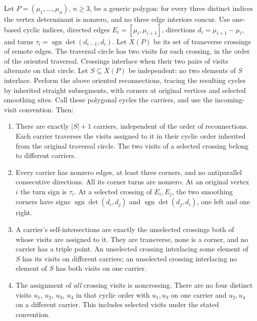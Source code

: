 \begin{lemma}\label{lem:carriers}\leanok
Let $P=(\mu_1,\ldots,\mu_n)$, $n\geq3$, be a generic polygon: for every
three distinct indices the vertex determinant is nonzero, and no three
edge interiors concur.
Use one-based cyclic indices, directed edges
$E_i=[\mu_i,\mu_{i+1}]$, directions $d_i=\mu_{i+1}-\mu_i$, and turns
$\tau_i=\operatorname{sgn}\det(d_{i-1},d_i)$.
Let $X(P)$ be its set of transverse crossings of remote edges. The
traversal circle has two visits for each crossing, in the order of the
oriented traversal. Crossings interlace when their two pairs of visits
alternate on that circle. Let $S\subseteq X(P)$ be independent: no two
elements of $S$ interlace. Perform the above oriented reconnections,
tracing the resulting cycles by inherited straight subsegments, with
corners at original vertices and selected smoothing sites. Call these
polygonal cycles the carriers, and use the incoming-visit convention.
Then:
\begin{enumerate}
\item[(i)] There are exactly $|S|+1$ carriers, independent of the order
of reconnections. Each carrier traverses the visits assigned to it in
their cyclic order inherited from the original traversal circle.
The two visits of a selected crossing belong to different carriers.
\item[(ii)] Every carrier has nonzero edges, at least three corners,
and no antiparallel consecutive directions. All its corner turns are
nonzero. At an original vertex $i$ the turn sign is $\tau_i$.
At a selected crossing of $E_i,E_j$, the two smoothing corners have
signs $\operatorname{sgn}\det(d_i,d_j)$ and
$\operatorname{sgn}\det(d_j,d_i)$, one left and one right.
\item[(iii)] A carrier's self-intersections are exactly the unselected
crossings both of whose visits are assigned to it. They are transverse,
none is a corner, and no carrier has a triple point. An unselected
crossing interlacing some element of $S$ has its visits on different
carriers; an unselected crossing interlacing no element of $S$ has
both visits on one carrier.
\item[(iv)] The assignment of \emph{all} crossing visits is noncrossing.
There are no four distinct visits $u_1$, $u_2$, $u_3$, $u_4$ in that cyclic order
with $u_1,u_3$ on one carrier and $u_2,u_4$ on a different carrier.
This includes selected visits under the stated convention.
\end{enumerate}

\end{lemma}
